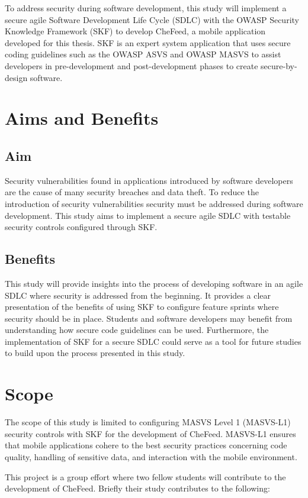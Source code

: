 To address security during software development, this study will implement a secure agile Software Development Life Cycle (SDLC) with the OWASP Security Knowledge Framework (SKF) to develop CheFeed, a mobile application developed for this thesis. SKF is an expert system application that uses secure coding guidelines such as the OWASP ASVS and OWASP MASVS to assist developers in pre-development and post-development phases to create secure-by-design software. 

\section{Aims and Benefits}

\subsection{Aim}
Security vulnerabilities found in applications introduced by software developers are the cause of many security breaches and data theft. To reduce the introduction of security vulnerabilities security must be addressed during software development. This study aims to implement a secure agile SDLC with testable security controls configured through SKF.

\subsection{Benefits}
This study will provide insights into the process of developing software in an agile SDLC where security is addressed from the beginning. It provides a clear presentation of the benefits of using SKF to configure feature sprints where security should be in place. Students and software developers may benefit from understanding how secure code guidelines can be used. Furthermore, the implementation of SKF for a secure SDLC could serve as a tool for future studies to build upon the process presented in this study.

\section{Scope}
The scope of this study is limited to configuring MASVS Level 1 (MASVS-L1) security controls with SKF for the development of CheFeed. MASVS-L1 ensures that mobile applications cohere to the best security practices concerning code quality, handling of sensitive data, and interaction with the mobile environment. 

This project is a group effort where two fellow students will contribute to the development of CheFeed. Briefly their study contributes to the following:

